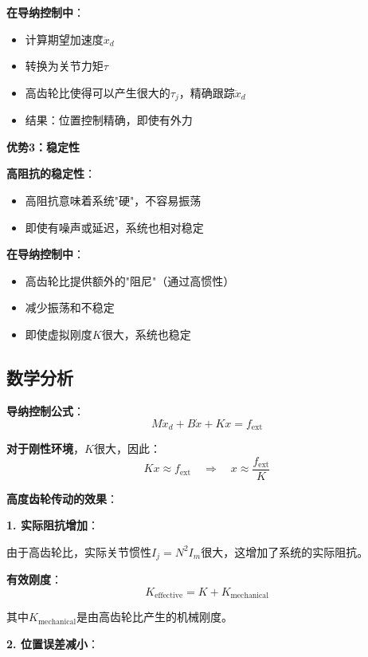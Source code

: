 \documentclass[12pt,a4paper]{article}
\begin{document}
\textbf{在导纳控制中}：
\begin{itemize}
\item 计算期望加速度$\ddot{x}_d$
\item 转换为关节力矩$\tau$
\item 高齿轮比使得可以产生很大的$\tau_j$，精确跟踪$\ddot{x}_d$
\item 结果：位置控制精确，即使有外力
\end{itemize}

\textbf{优势3：稳定性}

\textbf{高阻抗的稳定性}：
\begin{itemize}
\item 高阻抗意味着系统"硬"，不容易振荡
\item 即使有噪声或延迟，系统也相对稳定
\end{itemize}

\textbf{在导纳控制中}：
\begin{itemize}
\item 高齿轮比提供额外的"阻尼"（通过高惯性）
\item 减少振荡和不稳定
\item 即使虚拟刚度$K$很大，系统也稳定
\end{itemize}

\subsection{数学分析}

\textbf{导纳控制公式}：
\begin{equation}
M\ddot{x}_d + B\dot{x} + Kx = f_{\text{ext}}
\end{equation}

\textbf{对于刚性环境}，$K$很大，因此：
\begin{equation}
Kx \approx f_{\text{ext}} \quad \Rightarrow \quad x \approx \frac{f_{\text{ext}}}{K}
\end{equation}

\textbf{高度齿轮传动的效果}：

\textbf{1. 实际阻抗增加}：

由于高齿轮比，实际关节惯性$I_j = N^2 I_m$很大，这增加了系统的实际阻抗。

\textbf{有效刚度}：
\begin{equation}
K_{\text{effective}} = K + K_{\text{mechanical}}
\end{equation}

其中$K_{\text{mechanical}}$是由高齿轮比产生的机械刚度。

\textbf{2. 位置误差减小}：
\end{document}
